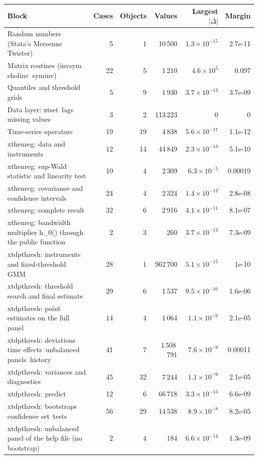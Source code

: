 \documentclass[
  10.5pt,
  a4paper,
]{article}
\begin{document}
\begin{longtable}{@{}p{7.4cm}rrrrr@{}}
\toprule
Block & Cases & Objects & Values & Largest $|\Delta|$ & Margin \\
\midrule
\endhead
Random numbers (Stata's Mersenne Twister) & 5 & 1 & 10\,500 & $1.3\times10^{-15}$ & 2.7e-11 \\
Matrix routines (invsym\, cholinv\, syminv) & 22 & 5 & 1\,210 & $4.6\times10^{5}$ & 0.097 \\
Quantiles and threshold grids & 5 & 9 & 1\,930 & $3.7\times10^{-13}$ & 3.7e-09 \\
Data layer: xtset\, lags\, missing values & 3 & 2 & 113\,223 & 0 & 0 \\
Time-series operators & 19 & 19 & 4\,838 & $5.6\times10^{-17}$ & 1.1e-12 \\
xthenreg: data and instruments & 12 & 14 & 44\,849 & $2.3\times10^{-13}$ & 5.1e-10 \\
xthenreg: sup-Wald statistic and linearity test & 10 & 4 & 2\,309 & $6.3\times10^{-5}$ & 0.00019 \\
xthenreg: covariance and confidence intervals & 24 & 4 & 2\,324 & $1.4\times10^{-12}$ & 2.8e-08 \\
xthenreg: complete result & 32 & 6 & 2\,916 & $4.1\times10^{-11}$ & 8.1e-07 \\
xthenreg: bandwidth multiplier h\_0() through the public function & 2 & 3 & 260 & $3.7\times10^{-13}$ & 7.3e-09 \\
xtdpthresh: instruments and fixed-threshold GMM & 28 & 1 & 962\,700 & $5.1\times10^{-15}$ & 1e-10 \\
xtdpthresh: threshold search and final estimate & 29 & 6 & 1\,537 & $9.5\times10^{-10}$ & 1.6e-06 \\
xtdpthresh: point estimates on the full panel & 14 & 4 & 1\,064 & $1.1\times10^{-9}$ & 2.1e-05 \\
xtdpthresh: deviations\, time effects\, unbalanced panels\, history & 41 & 7 & 1\,508\,791 & $7.6\times10^{-9}$ & 0.00011 \\
xtdpthresh: variances and diagnostics & 45 & 32 & 7\,244 & $1.1\times10^{-9}$ & 2.1e-05 \\
xtdpthresh: predict & 12 & 6 & 66\,718 & $3.3\times10^{-13}$ & 6.6e-09 \\
xtdpthresh: bootstraps\, confidence set\, tests & 56 & 29 & 14\,538 & $8.9\times10^{-8}$ & 8.2e-05 \\
xtdpthresh: unbalanced panel of the help file (no bootstrap) & 2 & 4 & 184 & $6.6\times10^{-14}$ & 1.3e-09 \\

\end{longtable}
\end{document}
